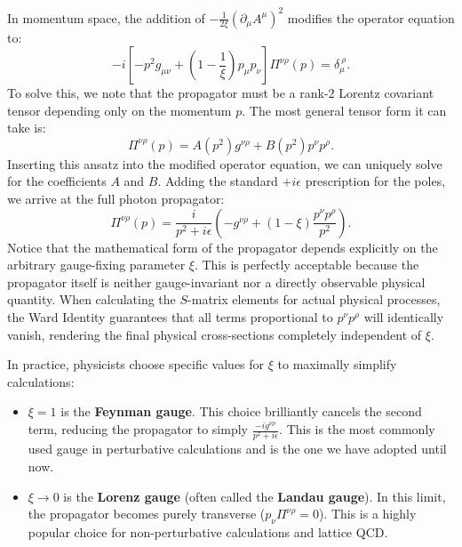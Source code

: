 In momentum space, the addition of $-\frac{1}{2\xi} (\partial_\mu A^\mu)^2$ modifies the operator equation to:
\[
    -i \left[ -p^2 g_{\mu\nu} + \left(1 - \frac{1}{\xi}\right) p_\mu p_\nu \right] \Pi^{\nu\rho}(p) = \delta_\mu^{\ \rho}.
\]
To solve this, we note that the propagator must be a rank-2 Lorentz covariant tensor depending only on the momentum $p$. The most general tensor form it can take is:
\[
    \Pi^{\nu\rho}(p) = A(p^2) g^{\nu\rho} + B(p^2) p^\nu p^\rho.
\]
Inserting this ansatz into the modified operator equation, we can uniquely solve for the coefficients $A$ and $B$. Adding the standard $+i\epsilon$ prescription for the poles, we arrive at the full photon propagator:
\[
    \Pi^{\nu\rho}(p) = \frac{i}{p^2 + i\epsilon} \left( -g^{\nu\rho} + (1 - \xi) \frac{p^\nu p^\rho}{p^2} \right).
\]
Notice that the mathematical form of the propagator depends explicitly on the arbitrary gauge-fixing parameter $\xi$. This is perfectly acceptable because the propagator itself is neither gauge-invariant nor a directly observable physical quantity. When calculating the $S$-matrix elements for actual physical processes, the Ward Identity guarantees that all terms proportional to $p^\nu p^\rho$ will identically vanish, rendering the final physical cross-sections completely independent of $\xi$.

In practice, physicists choose specific values for $\xi$ to maximally simplify calculations:
\begin{itemize}
    \item $\xi = 1$ is the \textbf{Feynman gauge}. This choice brilliantly cancels the second term, reducing the propagator to simply $\frac{-ig^{\nu\rho}}{p^2 + i\epsilon}$. This is the most commonly used gauge in perturbative calculations and is the one we have adopted until now.
    \item $\xi \to 0$ is the \textbf{Lorenz gauge} (often called the \textbf{Landau gauge}). In this limit, the propagator becomes purely transverse ($p_\nu \Pi^{\nu\rho} = 0$). This is a highly popular choice for non-perturbative calculations and lattice QCD.
\end{itemize}